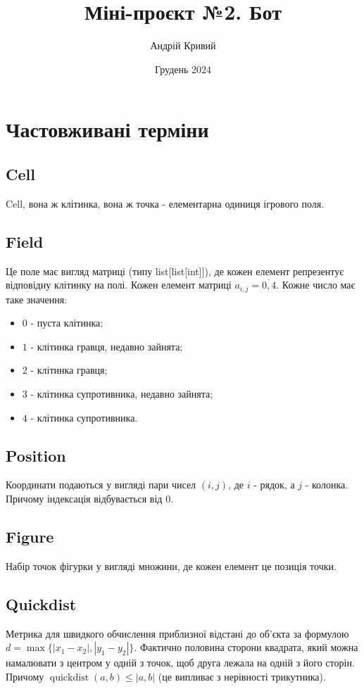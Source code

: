 \documentclass{article}
\title{Міні-проєкт №2. Бот}
\author{Андрій Кривий}
\date{Грудень 2024}
\begin{document}
\maketitle

\tableofcontents

\newcommand{\quickdist}{\operatorname{quickdist}}

\section{Частовживані терміни}

\subsection{Cell}
Cell, вона ж клітинка, вона ж точка - елементарна одиниця ігрового поля.

\subsection{Field}
Це поле має вигляд матриці (типу list[list[int]]), де кожен елемент репрезентує відповідну клітинку на полі. Кожен елемент матриці $a_{i,j} = \overline{0,4}$. Кожне число має таке значення:
\begin{itemize}
    \item $0$ - пуста клітинка;
    \item $1$ - клітинка гравця, недавно зайнята;
    \item $2$ - клітинка гравця;
    \item $3$ - клітинка супротивника, недавно зайнята;
    \item $4$ - клітинка супротивника.
\end{itemize}

\subsection{Position}
Координати подаються у вигляді пари чисел $(i, j)$, де $i$ - рядок, а $j$ - колонка. Причому індексація відбувається від $0$.

\subsection{Figure}
Набір точок фігурки у вигляді множини, де кожен елемент це позиція точки.

\subsection{Quickdist}
Метрика для швидкого обчислення приблизної відстані до об'єкта за формулою $d = \max\{|x_1 - x_2|, |y_1 - y_2|\}$. Фактично половина сторони квадрата, який можна намалювати з центром у одній з точок, щоб друга лежала на одній з його сторін. Причому $\quickdist(a, b) \leq |a, b|$ (це випливає з нерівності трикутника).
\end{document}
